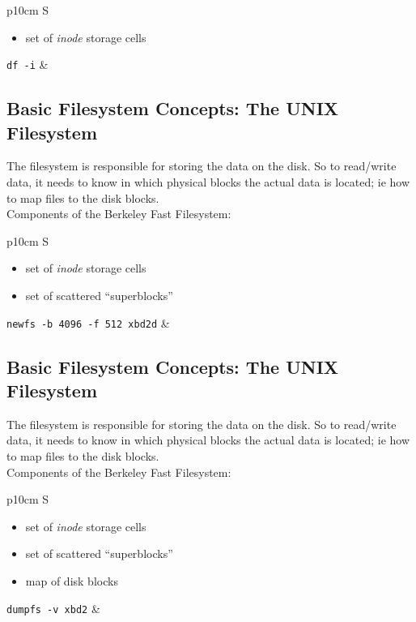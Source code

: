 \documentclass[xga]{xdvislides}
\begin{document}
\begin{tabular}{ p{10cm} S }
\begin{itemize}
	\item set of {\em inode} storage cells
\end{itemize}
{\tt df -i}
&  \\
\end{tabular}

\subsection{Basic Filesystem Concepts: The UNIX Filesystem}
The filesystem is responsible for storing the data on the disk.
So to read/write data, it needs to know in which physical blocks the actual
data is located; ie how to map files to the disk blocks.
\\

Components of the Berkeley Fast Filesystem:
\\

\begin{tabular}{ p{10cm} S }
\begin{itemize}
	\item set of {\em inode} storage cells
	\item set of scattered ``superblocks''
\end{itemize}
{\tt newfs -b 4096 -f 512 xbd2d}
&  \\
\end{tabular}

\subsection{Basic Filesystem Concepts: The UNIX Filesystem}
The filesystem is responsible for storing the data on the disk.
So to read/write data, it needs to know in which physical blocks the actual
data is located; ie how to map files to the disk blocks.
\\

Components of the Berkeley Fast Filesystem:
\\

\begin{tabular}{ p{10cm} S }
\begin{itemize}
	\item set of {\em inode} storage cells
	\item set of scattered ``superblocks''
	\item map of disk blocks
\end{itemize}
{\tt dumpfs -v xbd2}
&  \\
\end{tabular}
\end{document}
